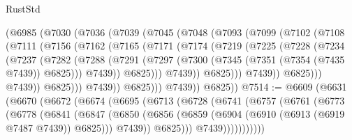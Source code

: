 \begin{lexlean}{RustStd}
\begin{coremodule}
            (@6985
              (@7030
                (@7036
                  (@7039
                    (@7045
                      (@7048
                        (@7093
                          (@7099
                            (@7102
                              (@7108
                                (@7111
                                  (@7156
                                    (@7162
                                      (@7165
                                        (@7171
                                          (@7174
                                            (@7219
                                              (@7225
                                                (@7228
                                                  (@7234
                                                    (@7237
                                                      (@7282
                                                        (@7288
                                                          (@7291
                                                            (@7297
                                                              (@7300
                                                                (@7345
                                                                  (@7351
                                                                    (@7354 (@7435 @7439))
                                                                    @6825)))
                                                              @7439))
                                                          @6825)))
                                                    @7439))
                                                @6825)))
                                          @7439))
                                      @6825)))
                                @7439))
                            @6825)))
                      @7439))
                  @6825)))
            @7439))
        @6825))
@7514 := @6609
    (@6631
      (@6670
        (@6672
          (@6674
            (@6695
              (@6713
                (@6728
                  (@6741
                    (@6757
                      (@6761
                        (@6773
                          (@6778
                            (@6841
                              (@6847
                                (@6850
                                  (@6856
                                    (@6859 (@6904 (@6910 (@6913 (@6919 @7487 @7439)) @6825)))
                                    @7439))
                                @6825)))
                          @7439)))))))))))

\end{coremodule}
\end{lexlean}
